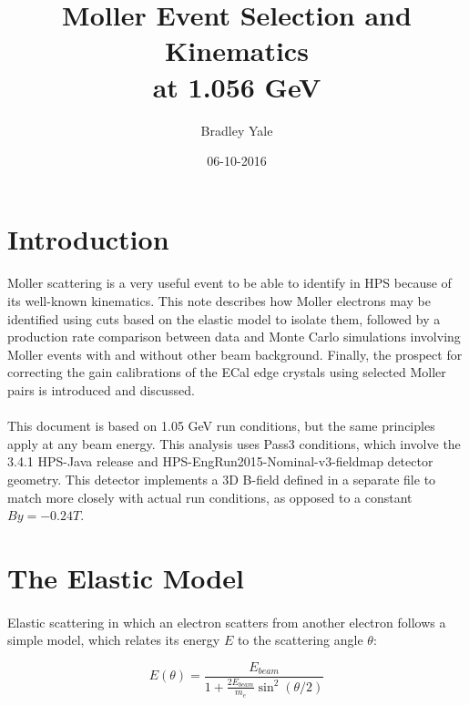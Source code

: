 \documentclass{article}
\title{Moller Event Selection and Kinematics\\at 1.056 GeV}
\date{06-10-2016}
\author{Bradley Yale}
\begin{document}
	\maketitle
	\newpage

\section{Introduction}

	\paragraph{}
	Moller scattering is a very useful event to be able to identify in HPS because of its well-known kinematics. This note describes how Moller electrons may be identified using cuts based on the elastic model to isolate them, followed by a production rate comparison between data and Monte Carlo simulations involving Moller events with and without other beam background. Finally, the prospect for correcting the gain calibrations of the ECal edge crystals using selected Moller pairs is introduced and discussed. 
	\paragraph{}
This document is based on 1.05 GeV run conditions, but the same principles apply at any beam energy. This analysis uses Pass3 conditions, which involve the 3.4.1 HPS-Java release and HPS-EngRun2015-Nominal-v3-fieldmap detector geometry. This detector implements a 3D B-field defined in a separate file to match more closely with actual run conditions, as opposed to a constant $By = -0.24 T$.

\section{The Elastic Model}

	\paragraph{}
	Elastic scattering in which an electron scatters from another electron follows a simple model, which relates its energy $E$ to the scattering angle $\theta$:

	\begin{equation}	\label{eq:ET}
  	E(\theta) = \frac{E_{beam}}{1+\frac{2E_{beam}}{m_e}\sin^2{\left(\theta/2\right)}}
	\end{equation}
\end{document}
